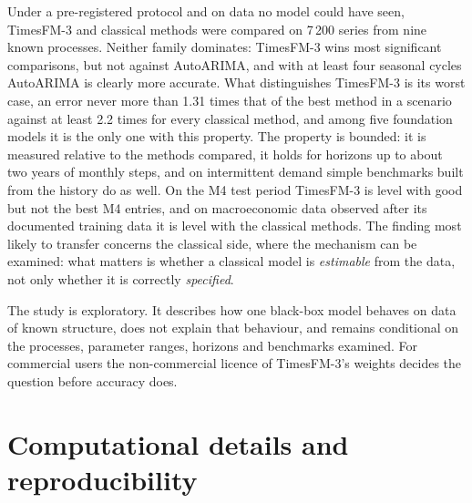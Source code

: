 \documentclass[ASNA]{USG}
\begin{document}
Under a pre-registered protocol and on data no model could have seen, TimesFM-3 and classical methods were
compared on 7\,200 series from nine known processes. Neither family dominates: TimesFM-3 wins most
significant comparisons, but not against AutoARIMA, and with at least four seasonal cycles AutoARIMA is
clearly more accurate. What distinguishes TimesFM-3 is its worst case, an error never more than 1.31 times that of the best method in a scenario against at least
2.2 times for every classical method, and among five foundation models it is
the only one with this property. The property is bounded: it is measured relative to the methods compared,
it holds for horizons up to about two years of monthly steps, and on intermittent demand simple benchmarks
built from the history do as well. On the M4 test period TimesFM-3 is level with good but not the best M4 entries, and on macroeconomic data
observed after its documented training data it is level with the classical methods. The finding most likely to transfer concerns the classical side, where the mechanism can be
examined: what matters is whether a classical model is \emph{estimable} from the data, not only whether it is
correctly \emph{specified}.

The study is exploratory. It describes how one black-box model behaves on data of known structure, does not
explain that behaviour, and remains conditional on the processes, parameter ranges, horizons and benchmarks
examined. For commercial users the non-commercial licence of TimesFM-3's weights decides the question before
accuracy does.

\section{Computational details and reproducibility}
\label{sec:repro}
\end{document}

